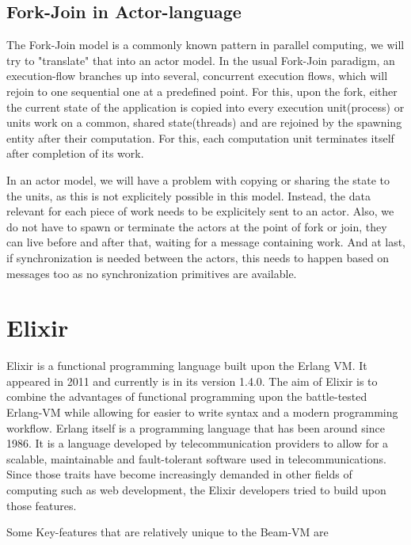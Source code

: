 \documentclass[]{paper}
\begin{document}
\subsection{Fork-Join in Actor-language}
The Fork-Join model is a commonly known pattern in parallel computing, we will try to "translate" that into an actor model. In the usual Fork-Join paradigm, an execution-flow branches up into several, concurrent execution flows, which will rejoin to one sequential one at a predefined point. For this, upon the fork, either the current state of the application is copied into every execution unit(process) or units work on a common, shared state(threads) and are rejoined by the spawning entity after their computation. For this, each computation unit terminates itself after completion of its work.

In an actor model, we will have a problem with copying or sharing the state to the units, as this is not explicitely possible in this model. Instead, the data relevant for each piece of work needs to be explicitely sent to an actor. Also, we do not have to spawn or terminate the actors at the point of fork or join, they can live before and after that, waiting for a message containing work. And at last, if synchronization is needed between the actors, this needs to happen based on messages too as no synchronization primitives are available.


\section{Elixir}

Elixir \cite{Elixir} is a functional programming language built upon the Erlang VM. It appeared in 2011 and currently is in its version 1.4.0. The aim of Elixir is to combine the advantages of functional programming upon the battle-tested Erlang-VM while allowing for easier to write syntax and a modern programming workflow. Erlang \cite{Erlang} itself is a programming language that has been around since 1986. It is a language developed by telecommunication providers to allow for a scalable, maintainable and fault-tolerant software used in telecommunications. Since those traits have become increasingly demanded in other fields of computing such as web development, the Elixir developers tried to build upon those features.

Some Key-features that are relatively unique to the Beam-VM are
\end{document}
